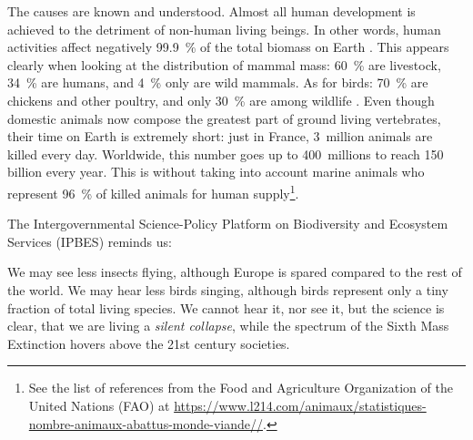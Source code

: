The causes are known and understood. Almost all human development is achieved to the detriment of non-human living beings. In other words, human activities affect negatively \SI{99.9}{\percent} of the total biomass on Earth \citep{bar-on_biomass_2018}.
This appears clearly when looking at the distribution of mammal mass: \SI{60}{\percent} are livestock, \SI{34}{\percent} are humans, and \SI{4}{\percent} only are wild mammals. As for birds: \SI{70}{\percent} are chickens and other poultry, and only \SI{30}{\percent} are among wildlife \citep{bar-on_biomass_2018}.
Even though domestic animals now compose the greatest part of ground living vertebrates, their time on Earth is extremely short: just in France, \SI{3}{million} animals are killed every day. Worldwide, this number goes up to \SI{400}{millions} to reach 150 billion every year. This is without taking into account marine animals who represent \SI{96}{\percent} of killed animals for human supply\footnote{See the list of references from the Food and Agriculture Organization of the United Nations (FAO) at \url{https://www.l214.com/animaux/statistiques-nombre-animaux-abattus-monde-viande//}.}.

The Intergovernmental Science-Policy Platform on Biodiversity and Ecosystem Services (IPBES) reminds us:

We may see less insects flying, although Europe is spared compared to the rest of the world. We may hear less birds singing, although birds represent only a tiny fraction of total living species. We cannot hear it, nor see it, but the science is clear, that we are living a \textit{silent collapse}, while the spectrum of the Sixth Mass Extinction hovers above the 21st century societies. 



